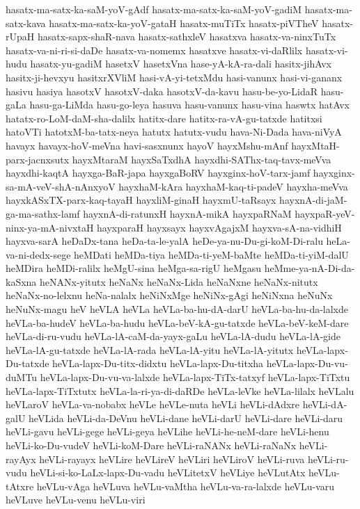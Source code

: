 {hasatx-ma-satx-ka-saM-yoV-gAdf
hasatx-ma-satx-ka-saM-yoV-gadiM
hasatx-ma-satx-kava
hasatx-ma-satx-ka-yoV-gataH
hasatx-muTiTx
hasatx-piVTheV
hasatx-rUpaH
hasatx-sapx-shaR-nava
hasatx-sathxleV
hasatxva
hasatx-va-ninxTuTx
hasatx-va-ni-ri-si-daDe
hasatx-va-nomemx
hasatxve
hasatx-vi-daRlilx
hasatx-vi-hudu
hasatx-yu-gadiM
hasetxV
hasetxVna
hase-yA-kA-ra-dali
hasitx-jihAvx
hasitx-ji-hevxyu
hasitxrXVliM
hasi-vA-yi-tetxMdu
hasi-vanunx
hasi-vi-gananx
hasivu
hasiya
hasotxV
hasotxV-daka
hasotxV-da-kavu
hasu-be-yo-LidaR
hasu-gaLa
hasu-ga-LiMda
hasu-go-leya
hasuva
hasu-vanunx
hasu-vina
haswtx
hatAvx
hatatx-ro-LoM-daM-sha-dalilx
hatitx-dare
hatitx-ra-vA-gu-tatxde
hatitxsi
hatoVTi
hatotxM-ba-tatx-neya
hatutx
hatutx-vudu
hava-Ni-Dada
hava-niVyA
havayx
havayx-hoV-meVna
havi-sasxnunx
hayoV
hayxMshu-mAnf
hayxMtaH-parx-jacnxsutx
hayxMtaraM
hayxSaTxdhA
hayxdhi-SAThx-taq-tavx-meVva
hayxdhi-kaqtA
hayxga-BaR-japa
hayxgaBoRV
hayxginx-hoV-tarx-jamf
hayxginx-sa-mA-veV-shA-nAnxyoV
hayxhaM-kAra
hayxhaM-kaq-ti-padeV
hayxha-meVva
hayxkASxTX-parx-kaq-tayaH
hayxliM-ginaH
hayxmU-taRsayx
hayxnA-di-jaM-ga-ma-sathx-lamf
hayxnA-di-ratunxH
hayxnA-mikA
hayxpaRNaM
hayxpaR-yeV-ninx-ya-mA-nivxtaH
hayxparaH
hayxsayx
hayxvAgajxM
hayxva-sA-na-vidhiH
hayxva-sarA
heDaDx-tana
heDa-ta-le-yalA
heDe-ya-nu-Du-gi-koM-Di-ralu
heLa-va-ni-dedx-sege
heMDati
heMDa-tiya
heMDa-ti-yeM-baMte
heMDa-ti-yiM-dalU
heMDira
heMDi-ralilx
heMgU-sina
heMga-sa-rigU
heMgasu
heMme-ya-nA-Di-da-kaSxna
heNANx-yitutx
heNaNx
heNaNx-Lida
heNaNxne
heNaNx-nitutx
heNaNx-no-lelxnu
heNa-nalalx
heNiNxMge
heNiNx-gAgi
heNiNxna
heNuNx
heNuNx-magu
heV
heVLA
heVLa
heVLa-ba-hu-dA-darU
heVLa-ba-hu-da-lalxde
heVLa-ba-hudeV
heVLa-ba-hudu
heVLa-beV-kA-gu-tatxde
heVLa-beV-keM-dare
heVLa-di-ru-vudu
heVLa-lA-caM-da-yayx-gaLu
heVLa-lA-dudu
heVLa-lA-gide
heVLa-lA-gu-tatxde
heVLa-lA-rada
heVLa-lA-yitu
heVLa-lA-yitutx
heVLa-lapx-Du-tatxde
heVLa-lapx-Du-titx-didxtu
heVLa-lapx-Du-titxha
heVLa-lapx-Du-vu-duMTu
heVLa-lapx-Du-vu-va-lalxde
heVLa-lapx-TiTx-tatxyf
heVLa-lapx-TiTxtu
heVLa-lapx-TiTxtutx
heVLa-la-ri-ya-di-daRDe
heVLa-leVke
heVLa-lilalx
heVLalu
heVLaroV
heVLa-va-nobabx
heVLe
heVLe-nuta
heVLi
heVLi-dAdxre
heVLi-dA-galU
heVLida
heVLi-da-DeVnu
heVLi-dane
heVLi-darU
heVLi-dare
heVLi-daru
heVLi-gavu
heVLi-gege
heVLi-geya
heVLihe
heVLi-he-neM-dare
heVLi-henu
heVLi-ko-Du-vudeV
heVLi-koM-Dare
heVLi-raNANx
heVLi-raNaNx
heVLi-rayAyx
heVLi-rayayx
heVLire
heVLireV
heVLiri
heVLiroV
heVLi-ruva
heVLi-ru-vudu
heVLi-si-ko-LaLx-lapx-Du-vadu
heVLitetxV
heVLiye
heVLutAtx
heVLu-tAtxre
heVLu-vAga
heVLuva
heVLu-vaMtha
heVLu-va-ra-lalxde
heVLu-varu
heVLuve
heVLu-venu
heVLu-viri
}
